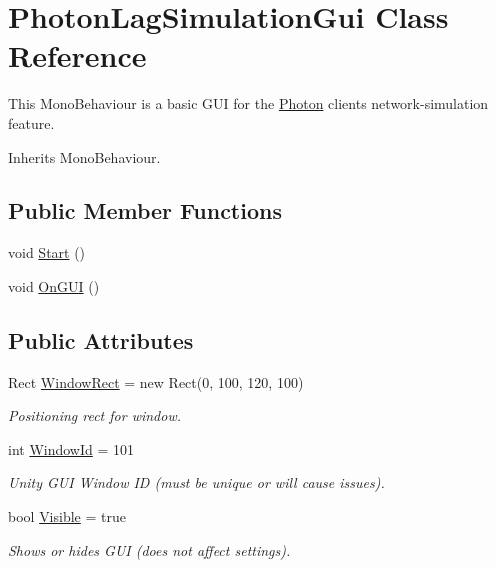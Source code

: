 \hypertarget{class_photon_lag_simulation_gui}{}\section{Photon\+Lag\+Simulation\+Gui Class Reference}
\label{class_photon_lag_simulation_gui}


This Mono\+Behaviour is a basic G\+UI for the \hyperlink{namespace_photon}{Photon} client\textquotesingle{}s network-\/simulation feature.  




Inherits Mono\+Behaviour.

\subsection*{Public Member Functions}
\begin{DoxyCompactItemize}
\item 
void \hyperlink{class_photon_lag_simulation_gui_ab080d78f9ae59eeb2779b5e61be897bb}{Start} ()
\item 
void \hyperlink{class_photon_lag_simulation_gui_abc9399cb95160e6994a1ad8661adbdc5}{On\+G\+UI} ()
\end{DoxyCompactItemize}
\subsection*{Public Attributes}
\begin{DoxyCompactItemize}
\item 
Rect \hyperlink{class_photon_lag_simulation_gui_a1d267bda81b30f6b32f77e4b5cc90649}{Window\+Rect} = new Rect(0, 100, 120, 100)
\begin{DoxyCompactList}\small\item\em Positioning rect for window.\end{DoxyCompactList}\item 
int \hyperlink{class_photon_lag_simulation_gui_a0e20da80809bd2181828edabed39ccc9}{Window\+Id} = 101
\begin{DoxyCompactList}\small\item\em Unity G\+UI Window ID (must be unique or will cause issues).\end{DoxyCompactList}\item 
bool \hyperlink{class_photon_lag_simulation_gui_ad790a872afa4c4c1b34401f55982203a}{Visible} = true
\begin{DoxyCompactList}\small\item\em Shows or hides G\+UI (does not affect settings).\end{DoxyCompactList}\end{DoxyCompactItemize}
